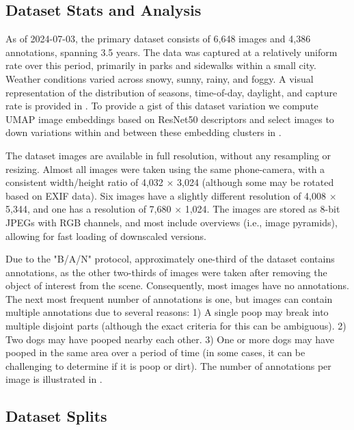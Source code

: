 \documentclass[10pt,twocolumn,letterpaper]{article}
\begin{document}
\subsection{Dataset Stats and Analysis}

As of 2024-07-03, the primary dataset consists of 6,648 images and 4,386 annotations, spanning 3.5 years.
The data was captured at a relatively uniform rate over this period, primarily in parks and sidewalks within
  a small city.
Weather conditions varied across snowy, sunny, rainy, and foggy.
A visual representation of the distribution of seasons, time-of-day, daylight, and capture rate is provided
  in .
To provide a gist of this dataset variation we compute UMAP \cite{mcinnes_umap_2020} image embeddings based
  on ResNet50 \cite{he2016deep} descriptors and select images to down variations within and between these
  embedding clusters in .


The dataset images are available in full resolution, without any resampling or resizing.
Almost all images were taken using the same phone-camera, with a consistent width/height ratio of 4,032
  $\times$ 3,024 (although some may be rotated based on EXIF data).
Six images have a slightly different resolution of 4,008 $\times$ 5,344, and one has a resolution of 7,680
  $\times$ 1,024.
The images are stored as 8-bit JPEGs with RGB channels, and most include overviews (i.e., image pyramids),
  allowing for fast loading of downscaled versions.


Due to the "B/A/N" protocol, approximately one-third of the dataset contains annotations, as the other
  two-thirds of images were taken after removing the object of interest from the scene.
Consequently, most images have no annotations.
The next most frequent number of annotations is one, but images can contain multiple annotations due to
  several reasons:
1) A single poop may break into multiple disjoint parts (although the exact criteria for this can be
  ambiguous).
2) Two dogs may have pooped nearby each other.
3) One or more dogs may have pooped in the same area over a period of time (in some cases, it can be
  challenging to determine if it is poop or dirt).
The number of annotations per image is illustrated in .


\subsection{Dataset Splits}
\end{document}

